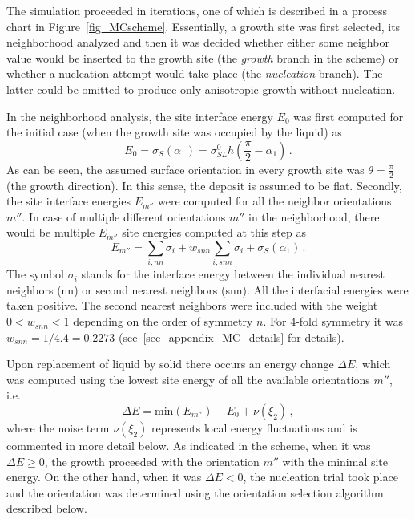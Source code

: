 The simulation proceeded in iterations, one of which is described in a process chart in Figure~\ref{fig_MCscheme}. Essentially, a growth site was first selected, its neighborhood analyzed and then it was decided whether either some neighbor value would be inserted to the growth site (the \textit{growth} branch in the scheme) or whether a nucleation attempt would take place (the \textit{nucleation} branch). The latter could be omitted to produce only anisotropic growth without nucleation.

In the neighborhood analysis, the site interface energy $E_0$ was first computed for the initial case (when the growth site was occupied by the liquid) as
\begin{equation}
	E_0 = \sigma_S(\alpha_1) = \sigma_{SL}^0\textstyle h\left(\frac{\pi}{2}-\alpha_1\right) \,.
\end{equation}
As can be seen, the assumed surface orientation in every growth site was $\theta=\textstyle\frac{\pi}{2}$ (the growth direction). In this sense, the deposit is assumed to be flat. Secondly, the site interface energies $E_{m''}$ were computed for all the neighbor orientations $m''$. In case of multiple different orientations $m''$ in the neighborhood, there would be multiple $E_{m''}$ site energies computed at this step as
\begin{equation}\label{eq_MC_local_energy}
	E_{m''} = \sum_{i, nn}\sigma_i + w_{snn}\sum_{i, snn}\sigma_i + \sigma_S(\alpha_1)  \,.
\end{equation}
The symbol $\sigma_i$ stands for the interface energy between the individual nearest neighbors (nn) or second nearest neighbors (snn). All the interfacial energies were taken positive. The second nearest neighbors were included with the weight $0<w_{snn}<1$ depending on the order of symmetry $n$. For 4-fold symmetry it was $w_{snn}=1/4.4=0.2273$ (see~\ref{sec_appendix_MC_details} for details).

Upon replacement of liquid by solid there occurs an energy change $\Delta E$, which was computed using the lowest site energy of all the available orientations $m''$, i.e.
\begin{equation}
	\Delta E = \mathrm{min}(E_{m''})-E_0 + \nu(\xi_2)\,,
\end{equation}
where the noise term $\nu(\xi_2)$ represents local energy fluctuations and is commented in more detail below. As indicated in the scheme, when it was $\Delta E\geq 0$, the growth proceeded with the orientation $m''$ with the minimal site energy. On the other hand, when it was $\Delta E < 0$, the nucleation trial took place and the orientation was determined using the orientation selection algorithm described below. 

